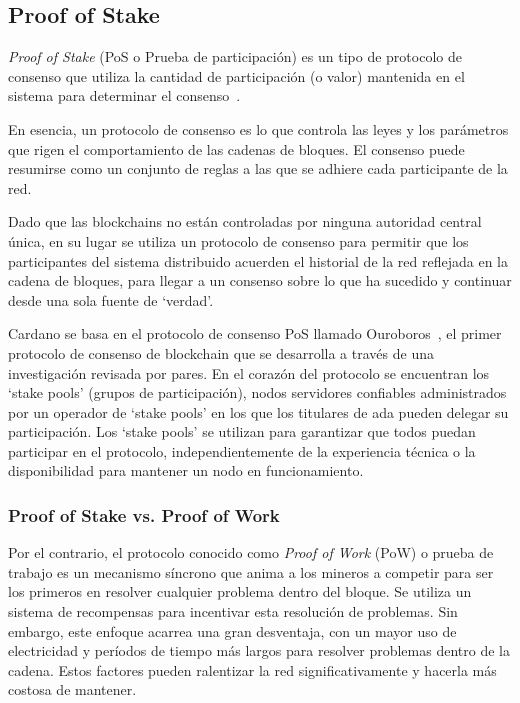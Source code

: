 \documentclass[12pt]{book}
\begin{document}
\subsection{Proof of Stake}

\textit{Proof of Stake} (PoS o Prueba de participación) es un tipo de protocolo de consenso que utiliza la cantidad de participación (o valor) mantenida en el sistema para determinar el consenso~\cite{PoS-PoW-pros-cons, PoS-PoW-energy, PoS-PoW-evaluation}.

En esencia, un protocolo de consenso es lo que controla las leyes y los parámetros que rigen el comportamiento de las cadenas de bloques. El consenso puede resumirse como un conjunto de reglas a las que se adhiere cada participante de la red.

Dado que las blockchains no están controladas por ninguna autoridad central única, en su lugar se utiliza un protocolo de consenso para permitir que los participantes del sistema distribuido acuerden el historial de la red reflejada en la cadena de bloques, para llegar a un consenso sobre lo que ha sucedido y continuar desde una sola fuente de `verdad'.

Cardano se basa en el protocolo de consenso PoS llamado Ouroboros~\cite{pof_ouroboros}, el primer protocolo de consenso de blockchain que se desarrolla a través de una investigación revisada por pares. En el corazón del protocolo se encuentran los `stake pools' (grupos de participación), nodos servidores confiables administrados por un operador de `stake pools' en los que los titulares de ada pueden delegar su participación. Los `stake pools' se utilizan para garantizar que todos puedan participar en el protocolo, independientemente de la experiencia técnica o la disponibilidad para mantener un nodo en funcionamiento.

\subsubsection{Proof of Stake vs. Proof of Work}

Por el contrario, el protocolo conocido como \textit{Proof of Work} (PoW) o prueba de trabajo es un mecanismo síncrono que anima a los mineros a competir para ser los primeros en resolver cualquier problema dentro del bloque. Se utiliza un sistema de recompensas para incentivar esta resolución de problemas. Sin embargo, este enfoque acarrea una gran desventaja, con un mayor uso de electricidad y períodos de tiempo más largos para resolver problemas dentro de la cadena. Estos factores pueden ralentizar la red significativamente y hacerla más costosa de mantener.
\end{document}
